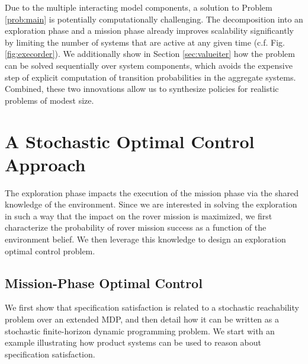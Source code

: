 \documentclass[conference]{IEEEtran}
\begin{document}

Due to the multiple interacting model components, a solution to Problem \ref{prob:main} is potentially computationally challenging. The decomposition into an exploration phase and a mission phase already improves scalability significantly by limiting the number of systems that are active at any given time (c.f. Fig. \ref{fig:execorder}). We additionally show in Section \ref{sec:valueiter} how the problem can be solved sequentially over system components, which avoids the expensive step of explicit computation of transition probabilities in the aggregate systems. Combined, these two innovations allow us to synthesize policies for realistic problems of modest size.


\section{A Stochastic Optimal Control Approach}
\label{sec:stochopt}


The exploration phase impacts the execution of the mission phase via the shared knowledge of the environment. Since we are interested in solving the exploration in such a way that the impact on the rover mission is maximized, we first characterize the probability of rover mission success as a function of the environment belief. We then leverage this knowledge to design an exploration optimal control problem.


\subsection{Mission-Phase Optimal Control}
We first show that specification satisfaction is related to a stochastic reachability problem over an extended MDP, and then detail how it can be written as a stochastic finite-horizon dynamic programming problem. We start with an example illustrating how product systems can be used to reason about specification satisfaction.
\end{document}
